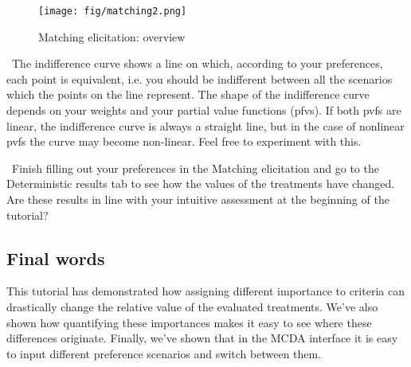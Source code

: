 \documentclass[00_mcda_tutorial.tex]{subfiles}
\begin{document}
\begin{figure}[!h]
    \centering
	\texttt{[image: fig/matching2.png]}
    \caption{Matching elicitation: overview}
	\label{fig:matching2}
\end{figure}

\noindent \faGraduationCap \, The indifference curve shows a line on which, according to your preferences, each point is equivalent, i.e. you should be indifferent between all the scenarios which the points on the line represent. The shape of the indifference curve depends on your weights and your partial value functions (pfvs). If both pvfs are linear, the indifference curve is always a straight line, but in the case of nonlinear pvfs the curve may become non-linear. Feel free to experiment with this.
\newline

\noindent \leftpointright \, Finish filling out your preferences in the Matching elicitation and go to the Deterministic results tab to see how the values of the treatments have changed. Are these results in line with your intuitive assessment at the beginning of the tutorial?

\subsection*{Final words}
This tutorial has demonstrated how assigning different importance to criteria can drastically change the relative value of the evaluated treatments. We’ve also shown how quantifying these importances makes it easy to see where these differences originate. Finally, we’ve shown that in the MCDA interface it is easy to input different preference scenarios and switch between them.
\end{document}
